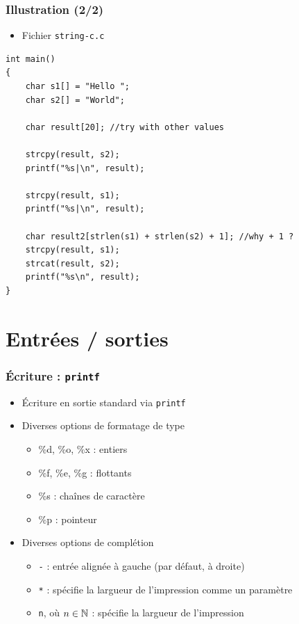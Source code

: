 \begin{frame}[containsverbatim]
\frametitle{Illustration (2/2)}
\begin{itemize}
\item Fichier \texttt{string-c.c}
\end{itemize}
\begin{lstlisting}
int main()
{
	char s1[] = "Hello ";
	char s2[] = "World";

	char result[20]; //try with other values

	strcpy(result, s2);	
	printf("%s|\n", result);

	strcpy(result, s1);
	printf("%s|\n", result);

	char result2[strlen(s1) + strlen(s2) + 1]; //why + 1 ?
	strcpy(result, s1);
	strcat(result, s2);
	printf("%s\n", result);	
}
\end{lstlisting}
\end{frame}

\section{Entrées / sorties}

\begin{frame}
\frametitle{Écriture : \texttt{printf}}
\begin{itemize}[<+->]
\item Écriture en sortie standard via \texttt{printf}
\item Diverses options de formatage de type
	\begin{itemize}
	\item \%d, \%o, \%x : entiers
	\item \%f, \%e, \%g : flottants
	\item \%s : chaînes de caractère
	\item \%p : pointeur
	\end{itemize}
\item Diverses options de complétion
	\begin{itemize}
	\item \texttt{-} : entrée alignée à gauche (par défaut, à droite)
	\item \texttt{*} : spécifie la largueur de l'impression comme un paramètre
	\item \texttt{n}, où $n \in {\mathbb N}$ : spécifie la largueur de l'impression
	\end{itemize}
\end{itemize}
\end{frame}

